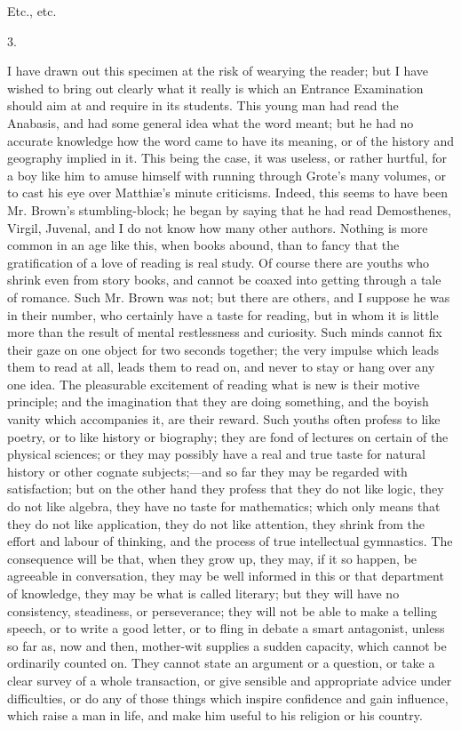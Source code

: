 Etc., etc.

3.

I have drawn out this specimen at the risk of wearying the reader;
but I have wished to bring out clearly what it really is which an
Entrance Examination should aim at and require in its students. This
young man had read the Anabasis, and had some general idea what the
word meant; but he had no accurate knowledge how the word came to have
its meaning, or of the history and geography implied in it. This being
the case, it was useless, or rather hurtful, for a boy like him to
amuse himself with running through Grote's many volumes, or to cast
his eye over Matthiæ's minute criticisms. Indeed, this seems to have
been Mr. Brown's stumbling-block; he began by saying that he had read
Demosthenes, Virgil, Juvenal, and I do not know how many other
authors. Nothing is more common in an age like this, when books
abound, than to fancy that the gratification of a love of reading is
real study. Of course there are youths who shrink even from story
books, and cannot be coaxed into getting through a tale of romance.
Such Mr. Brown was not; but there are others, and I suppose he was in
their number, who certainly have a taste for reading, but in whom it
is little more than the result of mental restlessness and curiosity.
Such minds cannot fix their gaze on one object for two seconds
together; the very impulse which leads them to read at all, leads them
to read on, and never to stay or hang over any one idea. The
pleasurable excitement of reading what is new is their motive
principle; and the imagination that they are doing something, and the
boyish vanity which accompanies it, are their reward. Such youths
often profess to like poetry, or to like history or biography; they
are fond of lectures on certain of the physical sciences; or they may
possibly have a real and true taste for natural history or other
cognate subjects;—and so far they may be regarded with satisfaction;
but on the other hand they profess that they do not like logic, they
do not like algebra, they have no taste for mathematics; which only
means that they do not like application, they do not like attention,
they shrink from the effort and labour of thinking, and the process of
true intellectual gymnastics. The consequence will be that, when they
grow up, they may, if it so happen, be agreeable in conversation, they
may be well informed in this or that department of knowledge, they may
be what is called literary; but they will have no consistency,
steadiness, or perseverance; they will not be able to make a telling
speech, or to write a good letter, or to fling in debate a smart
antagonist, unless so far as, now and then, mother-wit supplies a
sudden capacity, which cannot be ordinarily counted on. They cannot
state an argument or a question, or take a clear survey of a whole
transaction, or give sensible and appropriate advice under
difficulties, or do any of those things which inspire confidence and
gain influence, which raise a man in life, and make him useful to his
religion or his country.

